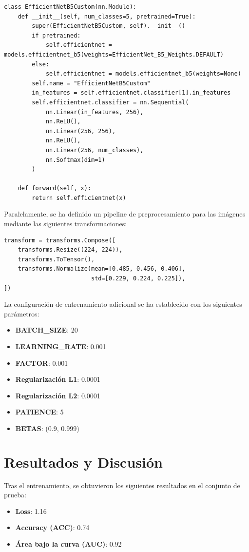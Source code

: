 \documentclass[11pt,spanish,listoffigures,listoftables]{tfgetsinf}
\begin{document}
\begin{verbatim}
class EfficientNetB5Custom(nn.Module):
    def __init__(self, num_classes=5, pretrained=True):
        super(EfficientNetB5Custom, self).__init__()
        if pretrained:
            self.efficientnet = models.efficientnet_b5(weights=EfficientNet_B5_Weights.DEFAULT)
        else:
            self.efficientnet = models.efficientnet_b5(weights=None)
        self.name = "EfficientNetB5Custom"
        in_features = self.efficientnet.classifier[1].in_features
        self.efficientnet.classifier = nn.Sequential(
            nn.Linear(in_features, 256),
            nn.ReLU(),
            nn.Linear(256, 256),
            nn.ReLU(),
            nn.Linear(256, num_classes),
            nn.Softmax(dim=1)
        )
    
    def forward(self, x):
        return self.efficientnet(x)
\end{verbatim}

Paralelamente, se ha definido un pipeline de preprocesamiento para las imágenes mediante las siguientes transformaciones:

\begin{verbatim}
transform = transforms.Compose([
    transforms.Resize((224, 224)),
    transforms.ToTensor(),
    transforms.Normalize(mean=[0.485, 0.456, 0.406], 
                         std=[0.229, 0.224, 0.225]),
])
\end{verbatim}

La configuración de entrenamiento adicional se ha establecido con los siguientes parámetros:
\begin{itemize}
    \item \textbf{BATCH\_SIZE}: 20
    \item \textbf{LEARNING\_RATE}: 0.001
    \item \textbf{FACTOR}: 0.001
    \item \textbf{Regularización L1}: 0.0001
    \item \textbf{Regularización L2}: 0.0001
    \item \textbf{PATIENCE}: 5
    \item \textbf{BETAS}: (0.9, 0.999)
\end{itemize}

\section{Resultados y Discusión}
Tras el entrenamiento, se obtuvieron los siguientes resultados en el conjunto de prueba:
\begin{itemize}
    \item \textbf{Loss}: 1.16
    \item \textbf{Accuracy (ACC)}: 0.74
    \item \textbf{Área bajo la curva (AUC)}: 0.92
\end{itemize}
\end{document}

